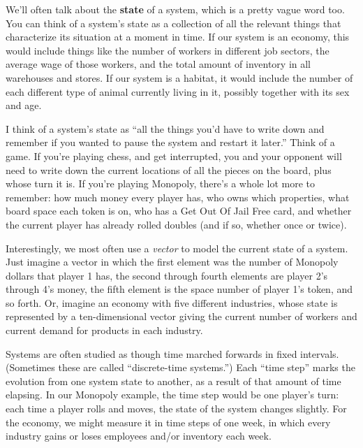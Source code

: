 
We'll often talk about the \textbf{state} of a system, which is a pretty vague
word too. You can think of a system's state as a collection of all the relevant
things that characterize its situation at a moment in time. If our system is an
economy, this would include things like the number of workers in different job
sectors, the average wage of those workers, and the total amount of inventory
in all warehouses and stores. If our system is a habitat, it would include the
number of each different type of animal currently living in it, possibly
together with its sex and age.


I think of a system's state as ``all the things you'd have to write down and
remember if you wanted to pause the system and restart it later.'' Think of a
game. If you're playing chess, and get interrupted, you and your opponent will
need to write down the current locations of all the pieces on the board, plus
whose turn it is. If you're playing Monopoly, there's a whole lot more to
remember: how much money every player has, who owns which properties, what
board space each token is on, who has a Get Out Of Jail Free card, and whether 
the current player has already rolled doubles (and if so, whether once or
twice).


Interestingly, we most often use a \textit{vector} to model the current state
of a system. Just imagine a vector in which the first element was the number of
Monopoly dollars that player 1 has, the second through fourth elements are
player 2's through 4's money, the fifth element is the space number of player
1's token, and so forth. Or, imagine an economy with five different industries,
whose state is represented by a ten-dimensional vector giving the current
number of workers and current demand for products in each industry.


Systems are often studied as though time marched forwards in fixed intervals.
(Sometimes these are called ``discrete-time systems.'') Each ``time step''
marks the evolution from one system state to another, as a result of that
amount of time elapsing. In our Monopoly example, the time step would be one
player's turn: each time a player rolls and moves, the state of the system
changes slightly. For the economy, we might measure it in time steps of one
week, in which every industry gains or loses employees and/or inventory each
week.

